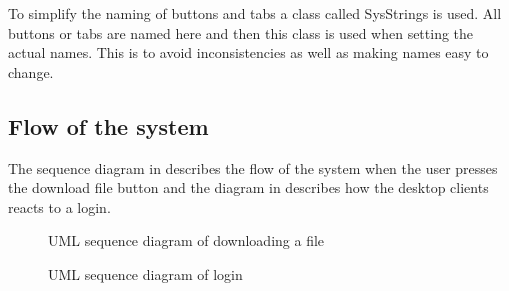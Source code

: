 To simplify the naming of buttons and tabs a class called SysStrings is used. All buttons or tabs are named here and then this class is used when setting the actual names. This is to avoid inconsistencies as well as making names easy to change.

\subsection{Flow of the system}

The sequence diagram in  describes the flow of the system when the user presses the download file button and the diagram in  describes how the desktop clients reacts to a login.

\begin{figure}[htb!]
	\caption{UML sequence diagram of downloading a file}
	\label{fig:des_download-sequence}
\end{figure}

\begin{figure}[htb!]
	\caption{UML sequence diagram of login}
	\label{fig:des_login-sequence}
\end{figure}
\FloatBarrier
